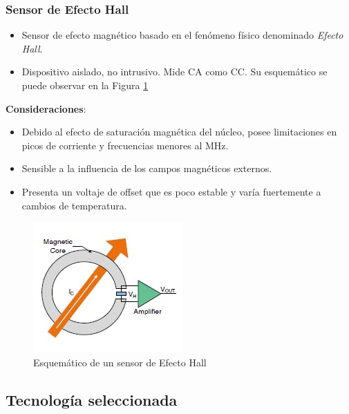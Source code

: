 \documentclass[10pt]{beamer}
\theoremstyle{remark}
\theoremstyle{definition}
\begin{document}
\begin{frame}[allowframebreaks]
	\frametitle{Sensor de Efecto Hall}
	\begin{itemize}
	  \item Sensor de efecto magnético basado en el fenómeno físico denominado
		\emph{Efecto Hall}.
	  \item Dispositivo aislado, no intrusivo. Mide CA como CC. Su esquemático
		se puede observar en la Figura \ref{sch_hall}
	\end{itemize}
	
	\textbf{Consideraciones}:
	\begin{itemize}
	  \item Debido al efecto de saturación magnética del núcleo, posee
		limitaciones en picos de corriente y frecuencias menores al MHz.
	  \item Sensible a la influencia de los campos magnéticos externos.
	  \item Presenta un voltaje de offset que es poco estable y varía
		fuertemente a cambios de temperatura.
	\end{itemize}
	
	\begin{figure}[h!]
	  \includegraphics{./images/Open-loop_Hall_Sensor.jpg}
	  \caption{Esquemático de un sensor de Efecto Hall}
	  \label{sch_hall}
	\end{figure}
\end{frame}

\subsection{Tecnología seleccionada}
\end{document}
